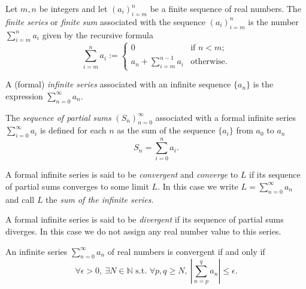 \begin{defn}
  Let $m,n$ be integers
  and let $(a_i)_{i=m}^n$ be a finite sequence of real numbers.
  The \emph{finite series} or \emph{finite sum} associated with the sequence
  $(a_i)_{i=m}^n$ is the number $\sum_{i=m}^n a_i$
  given by the recursive formula
  \begin{equation}
    \label{eq:finiteSeries}
    \sum_{i=m}^n a_i :=
    \begin{cases}
      0 & \text{if } n< m;
      \\
      a_n + \sum_{i=m}^{n-1} a_i & \text{otherwise}.
    \end{cases}
  \end{equation}
\end{defn}

\begin{defn}
  \label{def:seriesFromSequence}
  A (formal) \emph{infinite series} associated with an infinite sequence $\{a_n\}$
   is the expression $\sum_{n=0}^{\infty} a_n$.
\end{defn}

\begin{defn}
  The \emph{sequence of partial sums} $(S_n)_{n=0}^{\infty}$ associated
  with a formal infinite series
  $\sum_{i=0}^{\infty} a_i$
  is defined for each $n$ as the sum of the sequence $\{a_i\}$
  from $a_0$ to $a_n$
  \begin{equation}
    \label{eq:partialSum}
    S_n = \sum_{i=0}^{n} a_i.
  \end{equation}
\end{defn}

\begin{defn}
  A formal infinite series is said to be \emph{convergent}
  and \emph{converge} to $L$
  if its sequence of partial sums converges to some limit $L$.
  In this case we write $L=\sum_{n=0}^{\infty} a_n$
  and call $L$ the \emph{sum of the infinite series}.
\end{defn}

\begin{defn}
  A formal infinite series is said to be \emph{divergent}
  if its sequence of partial sums diverges.
  In this case we do not assign any real number value to this series.
\end{defn}

\begin{lem}
  \label{lem:seriesConvergeCauchy}
  An infinite series $\sum_{n=0}^{\infty} a_n$ of real numbers
  is convergent if and only if
  \begin{equation}
    \label{eq:seriesConvergeCauchy}
    \forall \epsilon>0,\ \exists N\in \mathbb{N} \text{ s.t. }
    \forall p,q\ge N, \ \left|\sum_{n=p}^q a_n\right| \le \epsilon.
  \end{equation}
\end{lem}


